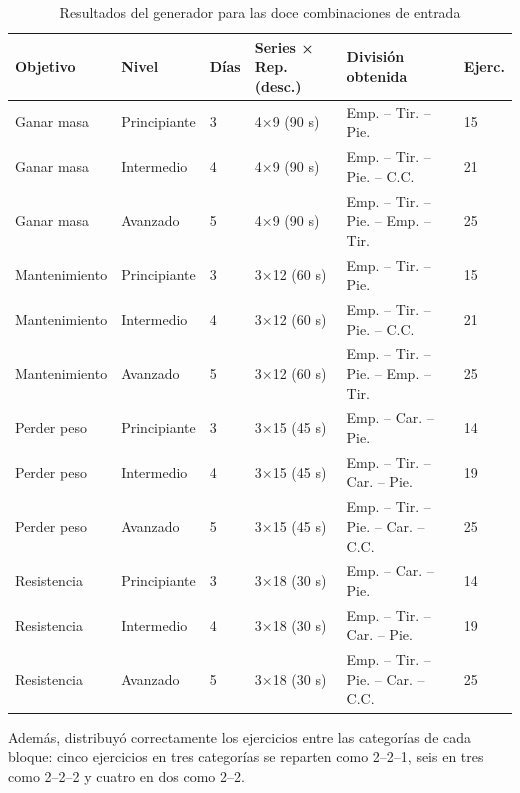 \begin{table}[H]
\centering
\caption{Resultados del generador para las doce combinaciones de entrada}
\label{tab:prueba-generador}
\small
\begin{tabular}{|L{2.5cm}|L{2.2cm}|C{0.9cm}|C{1.9cm}|L{4.4cm}|C{1.1cm}|}
\hline
{} \textbf{Objetivo} & \textbf{Nivel} & \textbf{Días} & \textbf{Series × Rep.
(desc.)} & \textbf{División obtenida} & \textbf{Ejerc.} \\
\hline
Ganar masa & Principiante & 3 & 4×9 (90 s) & Emp. -- Tir. -- Pie. & 15 \\ \hline
Ganar masa & Intermedio & 4 & 4×9 (90 s) & Emp. -- Tir. -- Pie. -- C.C. & 21 \\ \hline
Ganar masa & Avanzado & 5 & 4×9 (90 s) & Emp. -- Tir. -- Pie. -- Emp. -- Tir. & 25 \\ \hline
Mantenimiento & Principiante & 3 & 3×12 (60 s) & Emp. -- Tir. -- Pie. & 15 \\ \hline
Mantenimiento & Intermedio & 4 & 3×12 (60 s) & Emp. -- Tir. -- Pie. -- C.C. & 21 \\ \hline
Mantenimiento & Avanzado & 5 & 3×12 (60 s) & Emp. -- Tir. -- Pie. -- Emp. -- Tir. & 25 \\ \hline
Perder peso & Principiante & 3 & 3×15 (45 s) & Emp. -- Car. -- Pie. & 14 \\ \hline
Perder peso & Intermedio & 4 & 3×15 (45 s) & Emp. -- Tir. -- Car. -- Pie. & 19 \\ \hline
Perder peso & Avanzado & 5 & 3×15 (45 s) & Emp. -- Tir. -- Pie. -- Car. -- C.C. & 25 \\ \hline
Resistencia & Principiante & 3 & 3×18 (30 s) & Emp. -- Car. -- Pie. & 14 \\ \hline
Resistencia & Intermedio & 4 & 3×18 (30 s) & Emp. -- Tir. -- Car. -- Pie. & 19 \\ \hline
Resistencia & Avanzado & 5 & 3×18 (30 s) & Emp. -- Tir. -- Pie. -- Car. -- C.C. & 25 \\
\hline
\end{tabular}
\end{table}

Además,  distribuyó correctamente los ejercicios
entre las categorías de cada bloque: cinco ejercicios en tres categorías se
reparten como 2--2--1, seis en tres como 2--2--2 y cuatro en dos como 2--2.

